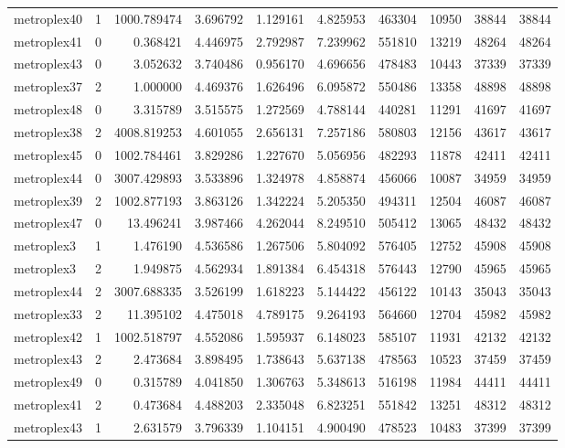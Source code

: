 \begin{longtable}{|l|r|r|r|r|r|r|r|r|r|}
metroplex40 & 1 & 1000.789474 & 3.696792 & 1.129161 & 4.825953 & 463304 & 10950 & 38844 & 38844 \\
metroplex41 & 0 & 0.368421 & 4.446975 & 2.792987 & 7.239962 & 551810 & 13219 & 48264 & 48264 \\
metroplex43 & 0 & 3.052632 & 3.740486 & 0.956170 & 4.696656 & 478483 & 10443 & 37339 & 37339 \\
metroplex37 & 2 & 1.000000 & 4.469376 & 1.626496 & 6.095872 & 550486 & 13358 & 48898 & 48898 \\
metroplex48 & 0 & 3.315789 & 3.515575 & 1.272569 & 4.788144 & 440281 & 11291 & 41697 & 41697 \\
metroplex38 & 2 & 4008.819253 & 4.601055 & 2.656131 & 7.257186 & 580803 & 12156 & 43617 & 43617 \\
metroplex45 & 0 & 1002.784461 & 3.829286 & 1.227670 & 5.056956 & 482293 & 11878 & 42411 & 42411 \\
metroplex44 & 0 & 3007.429893 & 3.533896 & 1.324978 & 4.858874 & 456066 & 10087 & 34959 & 34959 \\
metroplex39 & 2 & 1002.877193 & 3.863126 & 1.342224 & 5.205350 & 494311 & 12504 & 46087 & 46087 \\
metroplex47 & 0 & 13.496241 & 3.987466 & 4.262044 & 8.249510 & 505412 & 13065 & 48432 & 48432 \\
metroplex3 & 1 & 1.476190 & 4.536586 & 1.267506 & 5.804092 & 576405 & 12752 & 45908 & 45908 \\
metroplex3 & 2 & 1.949875 & 4.562934 & 1.891384 & 6.454318 & 576443 & 12790 & 45965 & 45965 \\
metroplex44 & 2 & 3007.688335 & 3.526199 & 1.618223 & 5.144422 & 456122 & 10143 & 35043 & 35043 \\
metroplex33 & 2 & 11.395102 & 4.475018 & 4.789175 & 9.264193 & 564660 & 12704 & 45982 & 45982 \\
metroplex42 & 1 & 1002.518797 & 4.552086 & 1.595937 & 6.148023 & 585107 & 11931 & 42132 & 42132 \\
metroplex43 & 2 & 2.473684 & 3.898495 & 1.738643 & 5.637138 & 478563 & 10523 & 37459 & 37459 \\
metroplex49 & 0 & 0.315789 & 4.041850 & 1.306763 & 5.348613 & 516198 & 11984 & 44411 & 44411 \\
metroplex41 & 2 & 0.473684 & 4.488203 & 2.335048 & 6.823251 & 551842 & 13251 & 48312 & 48312 \\
metroplex43 & 1 & 2.631579 & 3.796339 & 1.104151 & 4.900490 & 478523 & 10483 & 37399 & 37399 \\

\end{longtable}

